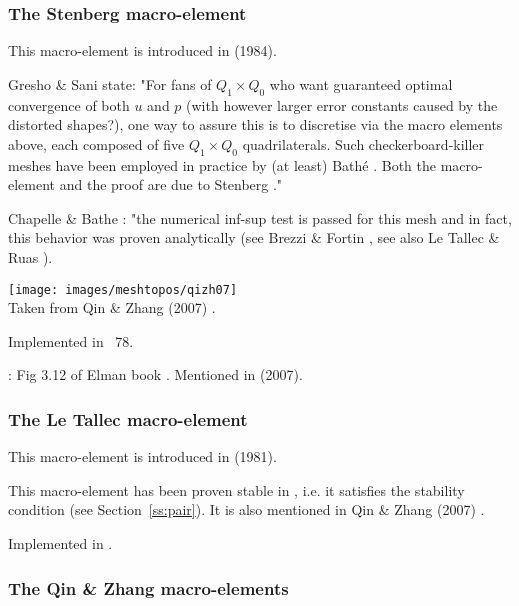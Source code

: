
\subsubsection{The Stenberg macro-element} 

This macro-element is introduced in \textcite{sten84} (1984). 



Gresho \& Sani \cite{grsa} state: "For fans of $Q_1\times Q_0$ who want 
guaranteed optimal convergence of both $u$ and $p$ (with however larger error 
constants caused by the distorted shapes?), one way to assure this is
to discretise via the macro elements above, each composed of five $Q_1\times Q_0$
quadrilaterals. Such checkerboard-killer meshes have been employed in practice
by (at least) Bath\'e \cite{chba93}. Both the macro-element and the proof are
due to Stenberg \cite{sten84}."

Chapelle \& Bathe \cite{chba93}: "the numerical inf-sup test is passed for this mesh and in fact,
this behavior was proven analytically (see Brezzi \& Fortin \cite{brfo}, see 
also Le Tallec \& Ruas \cite{leru86}).

\begin{center}
\texttt{[image: images/meshtopos/qizh07]}\\
{\captionfont Taken from Qin \& Zhang (2007) \cite{qizh07}.}
\end{center}

Implemented in \stone~78.

\Literature: Fig 3.12 of Elman \etal book \cite{elsw}. Mentioned in \textcite{qizh07b} (2007).

\subsubsection{The Le Tallec macro-element} 

This macro-element is introduced in \textcite{leta81} (1981).



This macro-element has been proven stable in \cite{leta81,leru86}, i.e. it satisfies 
the stability condition (see Section~\ref{ss:pair}).
It is also mentioned in Qin \& Zhang (2007) \cite{qizh07}.

Implemented in .

\subsubsection{The Qin \& Zhang macro-elements}

